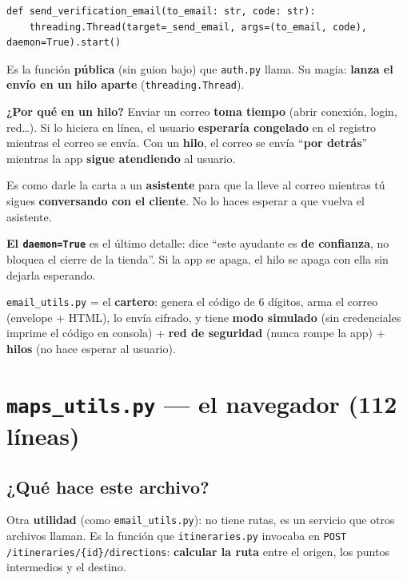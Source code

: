 \documentclass[11pt,a4paper]{article}
\begin{document}
\begin{lstlisting}
def send_verification_email(to_email: str, code: str):
    threading.Thread(target=_send_email, args=(to_email, code), daemon=True).start()
\end{lstlisting}

Es la función \textbf{pública} (sin guion bajo) que \texttt{auth.py} llama. Su magia:
\textbf{lanza el envío en un hilo aparte} (\texttt{threading.Thread}).

\textbf{¿Por qué en un hilo?} Enviar un correo \textbf{toma tiempo} (abrir conexión, login,
red\dots). Si lo hiciera en línea, el usuario \textbf{esperaría congelado} en el registro
mientras el correo se envía. Con un \textbf{hilo}, el correo se envía ``\textbf{por detrás}''
mientras la app \textbf{sigue atendiendo} al usuario.

\begin{analogia}
Es como darle la carta a un \textbf{asistente} para que la lleve al correo mientras tú sigues
\textbf{conversando con el cliente}. No lo haces esperar a que vuelva el asistente.
\end{analogia}

\textbf{El \texttt{daemon=True} } es el último detalle: dice ``este ayudante es \textbf{de
confianza}, no bloquea el cierre de la tienda''. Si la app se apaga, el hilo se apaga con ella
sin dejarla esperando.

\begin{recuadro}
\texttt{email\_utils.py} = el \textbf{cartero}: genera el código de 6 dígitos, arma el correo
(envelope + HTML), lo envía cifrado, y tiene \textbf{modo simulado} (sin credenciales imprime
el código en consola) + \textbf{red de seguridad} (nunca rompe la app) + \textbf{hilos} (no
hace esperar al usuario).
\end{recuadro}

\section{\texttt{maps\_utils.py} --- el navegador (112 líneas)}

\subsection{¿Qué hace este archivo?}

Otra \textbf{utilidad} (como \texttt{email\_utils.py}): no tiene rutas, es un servicio que
otros archivos llaman. Es la función que \texttt{itineraries.py} invocaba en
\texttt{POST /itineraries/\{id\}/directions}: \textbf{calcular la ruta} entre el origen, los
puntos intermedios y el destino.
\end{document}
